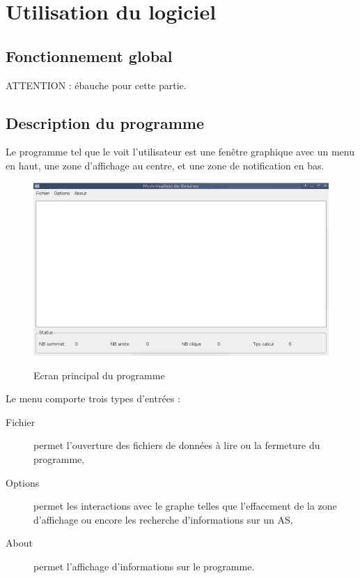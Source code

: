 \section{Utilisation du logiciel}
\subsection{Fonctionnement global}


ATTENTION : \'ebauche pour cette partie.
\subsection{Description du programme}

Le programme tel que le voit l'utilisateur est une fen\^etre graphique avec un menu en haut, une zone d'affichage au centre, et une zone de notification en bas.

\begin{figure}[ht]
\centering
 \fbox
 {
 \includegraphics[width=16cm]{./schema/capture_ecran_programme.png}
 }
  \caption{\label{ecran_principal}Ecran principal du programme}
\end{figure}


Le menu comporte trois types d'entr\'ees :
\begin{description}
 \item[Fichier] permet l'ouverture des fichiers de donn\'ees \`a lire ou la fermeture du programme,
 \item[Options] permet les interactions avec le graphe telles que l'effacement de la zone d'affichage ou encore les recherche d'informations sur un AS,
 \item[About] permet l'affichage d'informations sur le programme.
\end{description}

